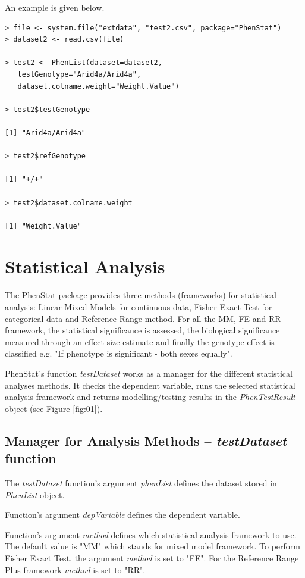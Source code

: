 \documentclass[12pt,a4paper]{article}
\begin{document}
An example is given below.


\begingroup
    \fontsize{8pt}{12pt}\selectfont
\begin{verbatim}
> file <- system.file("extdata", "test2.csv", package="PhenStat") 
> dataset2 <- read.csv(file)

> test2 <- PhenList(dataset=dataset2,
   testGenotype="Arid4a/Arid4a",
   dataset.colname.weight="Weight.Value")

> test2$testGenotype

[1] "Arid4a/Arid4a"

> test2$refGenotype

[1] "+/+"

> test2$dataset.colname.weight

[1] "Weight.Value"
\end{verbatim}
\endgroup

\section{Statistical Analysis}
The PhenStat package provides three methods (frameworks) for statistical analysis: Linear Mixed Models for continuous data, Fisher Exact Test for categorical data and Reference Range method. For all the MM, FE and RR framework, 
the statistical significance is assessed, the biological significance measured through an effect size estimate and finally the genotype effect is classified e.g. "If phenotype is significant - both sexes equally".  


PhenStat's function \textit{testDataset} works as a manager for the different statistical analyses methods. It checks the dependent variable, runs the selected statistical analysis framework and
 returns modelling\slash testing results in the \textit{PhenTestResult} object (see Figure \ref{fig:01}). 

\subsection{Manager for Analysis Methods -- \textit{testDataset} function}
The \textit{testDataset} function's argument \textit{phenList} defines the dataset stored in \textit{PhenList} object.

Function's argument \textit{depVariable} defines the dependent variable.

Function's argument \textit{method} defines which statistical analysis framework to use. 
The default value is "MM" which stands for mixed model framework. To perform Fisher Exact Test, the argument \textit{method} is set to "FE". For the Reference Range Plus framework \textit{method} is set to "RR".
\end{document}
